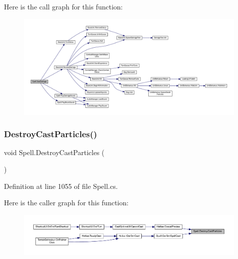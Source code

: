 Here is the call graph for this function\+:
\nopagebreak
\begin{figure}[H]
\begin{center}
\leavevmode
\includegraphics[width=350pt]{class_spell_ad2e4f64f1f7ced4b69c55619d5fdb0b0_cgraph}
\end{center}
\end{figure}
\mbox{\label{class_spell_a46dfa81169863ddb791b3c7d5121fcb8}} 
\subsubsection{\texorpdfstring{DestroyCastParticles()}{DestroyCastParticles()}}
{\footnotesize\ttfamily void Spell.\+Destroy\+Cast\+Particles (\begin{DoxyParamCaption}{ }\end{DoxyParamCaption})}



Definition at line 1055 of file Spell.\+cs.

Here is the caller graph for this function\+:
\nopagebreak
\begin{figure}[H]
\begin{center}
\leavevmode
\includegraphics[width=350pt]{class_spell_a46dfa81169863ddb791b3c7d5121fcb8_icgraph}
\end{center}
\end{figure}
\mbox{\label{class_spell_aa5a9b6a6b13fcd1cfed9eb43e123ca23}} 
